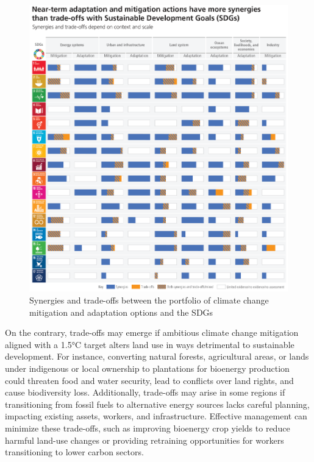 \begin{figure}[p]
    \centering
    \includegraphics[width=\textwidth]{figs/chap2/IPCC_AR6_SYR_Figure_4_5.png}
    \caption[Synergies and trade-offs of climate action to other SDGs]{Synergies and trade-offs between the portfolio of climate change mitigation and adaptation options and the SDGs \citep{lee2023climate}}
    \label{fig:chap2_fig6}
\end{figure}

On the contrary, trade-offs may emerge if ambitious climate change mitigation aligned with a 1.5°C target alters land use in ways detrimental to sustainable development. For instance, converting natural forests, agricultural areas, or lands under indigenous or local ownership to plantations for bioenergy production could threaten food and water security, lead to conflicts over land rights, and cause biodiversity loss. Additionally, trade-offs may arise in some regions if transitioning from fossil fuels to alternative energy sources lacks careful planning, impacting existing assets, workers, and infrastructure. Effective management can minimize these trade-offs, such as improving bioenergy crop yields to reduce harmful land-use changes or providing retraining opportunities for workers transitioning to lower carbon sectors. \par



